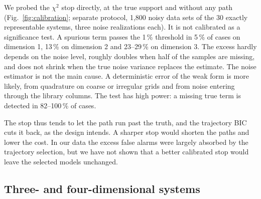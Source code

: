 \documentclass[10pt]{article}
\begin{document}
We probed the $\chi^2$ stop directly, at the true support and without any path (Fig.~\ref{fig:calibration}; separate
protocol, 1,800 noisy data sets of the 30 exactly representable systems, three noise realizations each). It is not
calibrated as a significance test. A spurious term passes the 1\,\% threshold in 5\,\% of cases on dimension 1,
13\,\% on dimension 2 and 23--29\,\% on dimension 3. The excess hardly depends on the noise level, roughly doubles
when half of the samples are missing, and does not shrink when the true noise variance replaces the estimate. The noise
estimator is not the main cause. A deterministic error of the weak form is more likely, from quadrature on
coarse or irregular grids and from noise entering through the library columns. The test has high power: a missing true
term is detected in 82--100\,\% of cases.

The stop thus tends to let the path run past the truth, and the trajectory BIC cuts it back, as the design intends. A
sharper stop would shorten the paths and lower the cost. In our data the excess false alarms were largely absorbed by
the trajectory selection, but we have not shown that a better calibrated stop would leave the selected models
unchanged.

\subsection{Three- and four-dimensional systems}\label{sec:dim3}
\end{document}
